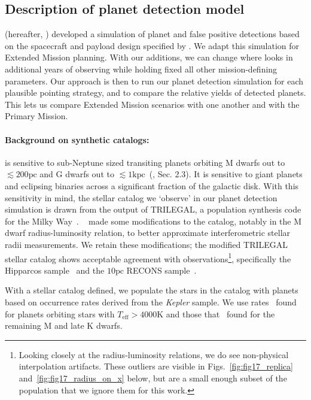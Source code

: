 \subsection{Description of planet detection model}
\label{sec:planet_detection_model}

\citet{Sullivan_2015} (hereafter, )
developed a simulation of \tesss planet and false positive detections
based on the spacecraft and payload design specified by
\citet{ricker_transiting_2014}.  We adapt this simulation for Extended
Mission planning.  With our additions, we can change where \tess looks
in additional years of observing while holding fixed all other
mission-defining parameters.  Our approach is then to run our planet
detection simulation for each plausible pointing strategy, and to
compare the relative yields of detected planets.  This lets us compare
Extended Mission scenarios with one another and with the Primary
Mission.

\paragraph{Background on synthetic catalogs:}

\tess is sensitive to sub-Neptune sized transiting planets orbiting M
dwarfs out to $\lesssim200\text{pc}$ and G dwarfs out to
$\lesssim1\text{kpc}$~(, Sec. 2.3).  It is
sensitive to giant planets and eclipsing binaries across a significant
fraction of the galactic disk.  With this sensitivity in mind, the
stellar catalog we `observe' in our planet detection simulation is
drawn from the output of TRILEGAL, a population synthesis code for the
Milky Way~\citep{girardi_star_2005}.  ~ made
some modifications to the catalog, notably in the M dwarf
radius-luminosity relation, to better approximate interferometric
stellar radii measurements.  We retain these modifications; the modified
TRILEGAL stellar catalog shows acceptable agreement with
observations\footnote{Looking closely at the radius-luminosity
  relations, we do see non-physical interpolation artifacts. These
  outliers are visible in Figs.~\ref{fig:fig17_replica}
  and~\ref{fig:fig17_radius_on_x} below, but are a small enough subset
  of the population that we ignore them for this work.}, specifically
the Hipparcos
sample~\citep{perryman_hipparcos_1997,van_leeuwen_validation_2007} and
the $10\text{pc}$ RECONS sample~\citep{henry_solar_2006}.

With a stellar catalog defined, we populate the stars in the catalog
with planets based on occurrence rates derived from the
\textit{Kepler} sample.  We use rates~\citet{fressin_false_2013} found
for planets orbiting stars with $T_\text{eff} > 4000\text{K}$ and
those that~\citet{dressing_occurrence_2015} found for the remaining M
and late K dwarfs.

